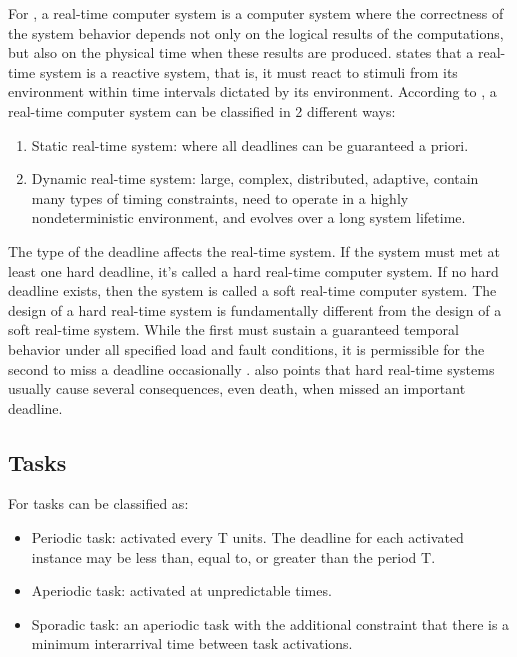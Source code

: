 \documentclass[12pt]{article}
\begin{document}
For \cite{kopetz2011real}, a real-time computer system is a computer system where the correctness 
of the system behavior depends not only on the logical results of the computations, but also on 
the physical time when these results are produced. \cite{lichtenstein1985glory} states that a real-time system 
is a reactive system, that is, it must react to stimuli from its environment within time intervals dictated by 
its environment. According to \cite{stankovic1990predictability}, a real-time computer system can be classified 
in 2 different ways:
\begin{enumerate}
 \item Static real-time system: where all deadlines can be guaranteed a priori.
 \item Dynamic real-time system: large, complex, distributed, adaptive, contain many types of timing constraints, 
need to operate in a highly nondeterministic environment, and evolves over a long system lifetime.
\end{enumerate}

The type of the deadline affects the real-time system. If the system must met at least
one hard deadline, it's called a hard real-time computer system.  If no hard deadline exists, 
then the system is called a soft real-time computer system. The design of a hard real-time system is 
fundamentally different from the design of a soft real-time system. While the first must sustain a guaranteed 
temporal behavior under all specified load and fault conditions, it is permissible for the second to miss a 
deadline occasionally \cite{kopetz2011real}. \cite{stankovic1996real} also points that hard real-time systems 
usually cause several consequences, even death, when missed an important deadline.

\subsection{Tasks}

For \cite{stankovic1996real} tasks can be classified as:

\begin{itemize}
  \item Periodic task: activated every T units. The deadline for each activated instance may be less than, equal to, 
or greater than the period T.
  \item Aperiodic task: activated at unpredictable times.
  \item Sporadic task: an aperiodic task with the additional constraint that there is a minimum interarrival time 
between task activations.
\end{itemize}
\end{document}
